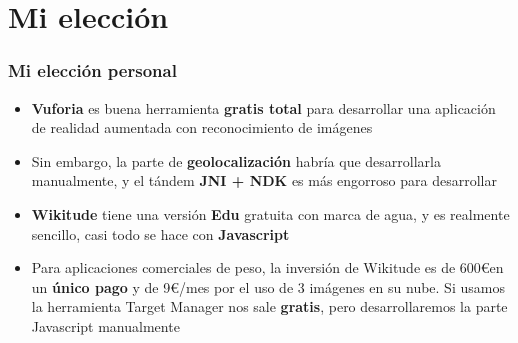 \section{Mi elección}
\frame
{
\frametitle{Mi elección personal}
\begin{itemize}
 \item \textbf{Vuforia} es buena herramienta \textbf{gratis total} para desarrollar una aplicación de realidad aumentada con reconocimiento de imágenes
 \item Sin embargo, la parte de \textbf{geolocalización} habría que desarrollarla manualmente, y el tándem \textbf{JNI + NDK} es más engorroso para desarrollar
 \item \textbf{Wikitude} tiene una versión \textbf{Edu} gratuita con marca de agua, y es realmente sencillo, casi todo se hace con \textbf{Javascript}
 \item Para aplicaciones comerciales de peso, la inversión de Wikitude es de 600\euro \hspace{0.15cm}en un \textbf{único pago} y de 9\euro/mes por el uso de 3 imágenes en su nube. Si usamos la herramienta Target Manager nos sale \textbf{gratis}, pero desarrollaremos la parte Javascript manualmente
\end{itemize}
}

